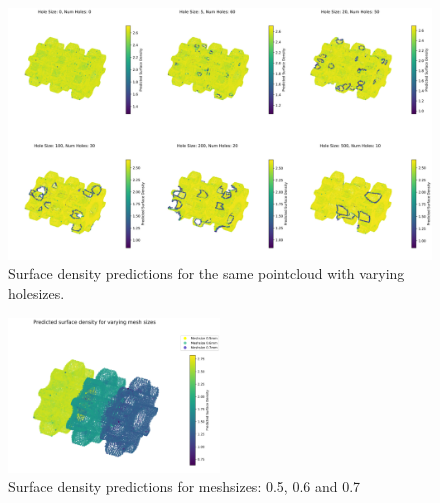 \begin{figure}[t]
    \centering
    \includegraphics[width=\textwidth]{figures/result3_lowQ.png}
    \caption{Surface density predictions for the same pointcloud with varying holesizes.}
    \label{fig:holes_predict}
\end{figure}

\begin{figure}[H]
    \centering
    \includegraphics[width=0.5\textwidth]{figures/varying_meshsize_lowQ.png}
    \caption{Surface density predictions for meshsizes: 0.5, 0.6 and 0.7}
    \label{fig:diff_mesh_predict}
\end{figure}
